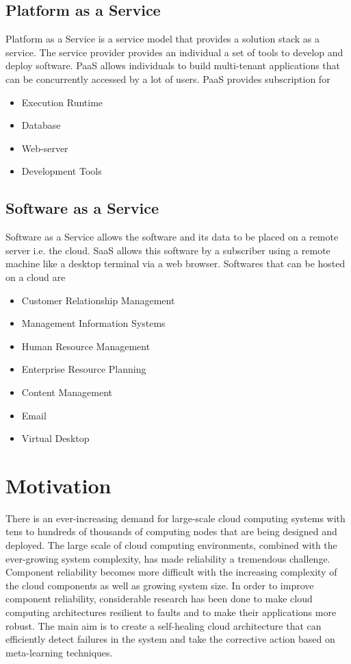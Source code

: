 \subsection{Platform as a Service}
Platform as a Service is a service model that provides a solution stack as a service. The service provider provides an individual a set of tools to develop and deploy software. PaaS allows individuals to build multi-tenant applications that can be concurrently accessed by a lot of users. PaaS provides subscription for
	\begin{itemize}
		\item Execution Runtime
		\item Database
		\item Web-server
		\item Development Tools
	\end{itemize}
\subsection{Software as a Service}
Software as a Service allows the software and its data to be placed on a remote server i.e. the cloud. SaaS allows this software by a subscriber using a remote machine like a desktop terminal via a web browser. Softwares that can be hosted on a cloud are
	\begin{itemize}
		\item Customer Relationship Management
		\item Management Information Systems
		\item Human Resource Management
		\item Enterprise Resource Planning
		\item Content Management
		\item Email
		\item Virtual Desktop
	\end{itemize}

\section{Motivation}
There is an ever-increasing demand for large-scale cloud computing systems with tens to hundreds of thousands of computing nodes that are being designed and deployed. The large scale of cloud computing environments, combined with the ever-growing system complexity, has made reliability a tremendous challenge. Component reliability becomes more difficult with the increasing complexity of the cloud components as well as growing system size.\cite{FAILURE_3} In order to improve component reliability, considerable research has been done to make cloud computing architectures resilient to faults and to make their applications more robust. The main aim is to create a self-healing cloud architecture that can efficiently detect failures in the system and take the corrective action based on meta-learning techniques.

